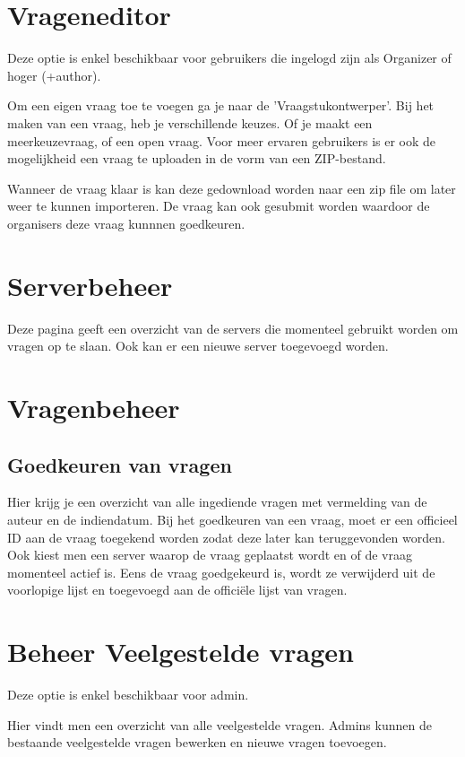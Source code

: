 \documentclass[]{article}
\begin{document}
\section{Vrageneditor}

Deze optie is enkel beschikbaar voor gebruikers die ingelogd zijn als Organizer of hoger (+author).

Om een eigen vraag toe te voegen ga je naar de 'Vraagstukontwerper'. Bij het maken van een vraag, heb je verschillende keuzes. Of je maakt een meerkeuzevraag, of een open vraag. Voor meer ervaren gebruikers is er ook de mogelijkheid een vraag te uploaden in de vorm van een ZIP-bestand.

Wanneer de vraag klaar is kan deze gedownload worden naar een zip file om later weer te kunnen importeren. De vraag kan ook
gesubmit worden waardoor de organisers deze vraag kunnnen goedkeuren.

\section{Serverbeheer}

Deze pagina geeft een overzicht van de servers die momenteel gebruikt worden om vragen op te slaan.
Ook kan er een nieuwe server toegevoegd worden.

\section{Vragenbeheer}

\subsection{Goedkeuren van vragen}
Hier krijg je een overzicht van alle ingediende vragen met vermelding van de auteur en de indiendatum.
Bij het goedkeuren van een vraag, moet er een officieel ID aan de vraag toegekend worden zodat deze later kan teruggevonden worden.
Ook kiest men een server waarop de vraag geplaatst wordt en of de vraag momenteel actief is. Eens de vraag goedgekeurd is, wordt
ze verwijderd uit de voorlopige lijst en toegevoegd aan de officiële lijst van vragen.

\section{Beheer Veelgestelde vragen}

Deze optie is enkel beschikbaar voor admin.

Hier vindt men een overzicht van alle veelgestelde vragen. Admins kunnen de bestaande veelgestelde vragen bewerken en nieuwe vragen toevoegen.
\end{document}
